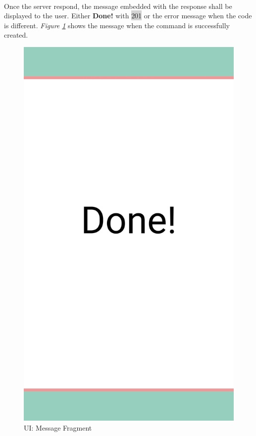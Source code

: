 \documentclass[12pt, oneside, a4paper]{book}
\newcommand{\code}[1]{{\color{red}\colorbox{lightgray}{#1}}}
\begin{document}
		\paragraph{} Once the server respond, the message embedded with the response shall be displayed to the user. Either \textbf{Done!} with \code{201} or the error message when the code is different. \textit{Figure \ref{fig:activity_done}} shows the message when the command is successfully created.
		\begin{figure}[H]
			\centering
			\includegraphics[width=.5\linewidth]{img/activity_done.jpg}
			\caption{UI: Message Fragment}
			\label{fig:activity_done}
		\end{figure}
\end{document}
